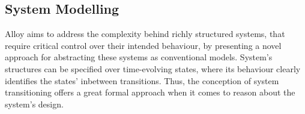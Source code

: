 %  

\subsection{System Modelling}\label{c:alloy-sm}

Alloy aims to address the complexity behind richly structured systems, that require critical control over their intended behaviour, by presenting a novel approach for abstracting these systems as conventional models. System's structures can be specified over time-evolving states, where its behaviour clearly identifies the states' inbetween transitions. Thus, the conception of system transitioning offers a great formal approach when it comes to reason about the system's design.

